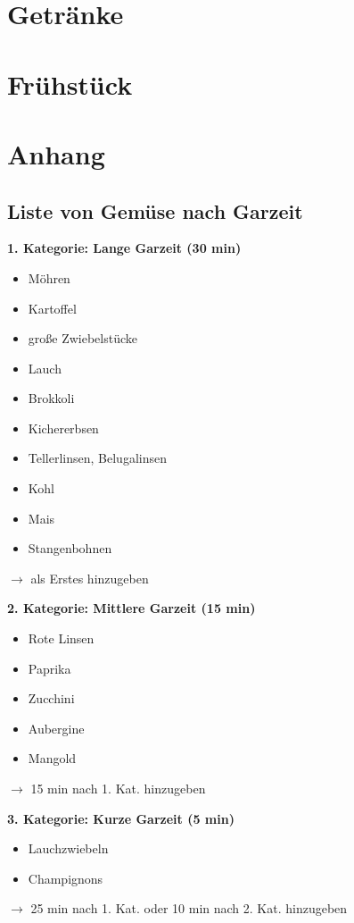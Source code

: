 \documentclass[a4paper, 12pt]{scrbook} 								%
\numberwithin{equation}{section} 									%
\begin{document}

\chapter{Getränke}


\chapter{Frühstück}



\chapter{Anhang}


\section{Liste von Gemüse nach Garzeit} \label{anhang:gemueseliste}

\textbf{1. Kategorie: Lange Garzeit (30 min)}
\begin{itemize}
	\item Möhren 
	\item Kartoffel
	\item große Zwiebelstücke
	\item Lauch
	\item Brokkoli
	\item Kichererbsen
	\item Tellerlinsen, Belugalinsen
	\item Kohl
	\item Mais
	\item Stangenbohnen
\end{itemize}
$\rightarrow$ als Erstes hinzugeben
\vspace{0.5cm}

\textbf{2. Kategorie: Mittlere Garzeit (15 min)}
\begin{itemize}
	\item Rote Linsen
	\item Paprika
	\item Zucchini
	\item Aubergine
	\item Mangold
\end{itemize}
$\rightarrow$ 15 min nach 1. Kat. hinzugeben 
\vspace{0.5cm}

\textbf{3. Kategorie: Kurze Garzeit (5 min)}
\begin{itemize}
	\item Lauchzwiebeln
	\item Champignons
\end{itemize}
$\rightarrow$ 25 min nach 1. Kat. oder 10 min nach 2. Kat. hinzugeben

\end{document}
